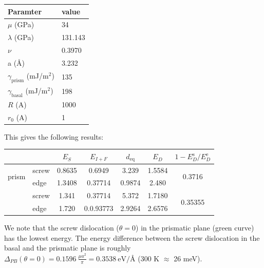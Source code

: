 \documentclass[10pt,a4paper,final]{article}
\begin{document}
\begin{table}[hb]
\centering

\begin{tabular}{ll} \toprule
Paramter & value \\ \midrule
$\mu$ (GPa) & 34 \\
$\lambda$ (GPa) & 131.143 \\
$\nu$ & 0.3970 \\
a (\AA) & 3.232 \\
$\gamma_{\text{prism}}$ (mJ/m$^2$) & 135 \\
$\gamma_{\text{basal}}$ (mJ/m$^2$) & 198 \\ 
$R$ (A) & 1000 \\
$r_0$ (A) & 1 \\
\bottomrule
\end{tabular}
\end{table}

This gives the following results:

\begin{table}[hbt]
\centering
\begin{tabular}{llccc|cc} \toprule
& & $E_{S}$ & $E_{I+F}$ & $d_\text{eq}$ & $E_D$ & $1-E^\text{s}_D/E^\text{e}_D$ \\ \midrule
\multirow{2}{*}{prism} & screw & 0.8635 & 0.6949 & 3.239 & 1.5584 & \multirow{2}{*}{0.3716}\\ & edge & 1.3408 & 0.37714 & 0.9874 & 2.480 & \\ 
\rule{0pt}{4ex} \multirow{2}{*}{basal} & screw & 1.341 & 0.37714 & 5.372 & 1.7180 & \multirow{2}{*}{0.35355} \\ & edge & 1.720 & 0.0.93773 & 2.9264 & 2.6576 & \\ 
\bottomrule

\end{tabular}

\end{table}

We note that the screw dislocation ($\theta=0$) in the prismatic plane (green curve) has the lowest energy. The energy difference between the screw dislocation in the basal and the prismatic plane is roughly $\Delta_{PB}(\theta=0) = 0.1596 ~\frac{\mu a^2}{\pi} = 0.3538 ~\text{eV/\AA}$ (300 K $\approx$ 26 meV).
\end{document}
